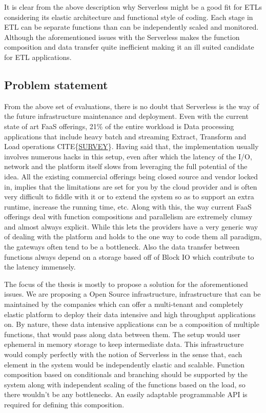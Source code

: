 \documentclass[12pt,titlepage]{article}
\begin{document}
It is clear from the above description why Serverless might be a good fit for
ETLs considering its elastic architecture and functional style of coding. Each
stage in ETL can be separate functions than can be independently scaled and
monitored. Although the aforementioned issues with the Serverless makes the
function composition and data transfer quite inefficient making it an ill suited
candidate for ETL applications.

\subsection{Problem statement}
\label{sec:org8e9acd7}
From the above set of evaluations, there is no doubt that Serverless is the way
of the future infrastructure maintenance and deployment. Even with the current
state of art FaaS offerings, 21\% of the entire workload is Data processing
applications that include heavy batch and streaming Extract, Transform and Load
operations CITE\{\href{https://www.serverless.com/blog/2018-serverless-community-survey-huge-growth-usage/}{SURVEY}\}. Having said that, the implementation usually involves
numerous hacks in this setup, even after which the latency of the I/O, network
and the platform itself slows from leveraging the full potential of the idea.
All the existing commercial offerings being closed source and vendor locked in,  
implies that the limitations are set for you by
the cloud provider and is often very difficult to fiddle with it or to extend
the system so as to support an extra runtime, increase the running time, etc.
Along with this, the way current FaaS offerings deal with function compositions
and parallelism are extremely clumsy and almost always explicit. While this lets
the providers have a very generic way of dealing with the platform and holds to
the one way to code them all paradigm, the gateways often tend to be a
bottleneck. Also the data transfer between functions always depend on a storage
based off of Block IO which contribute to the latency immensely.

The focus of the thesis is mostly to propose a solution for the aforementioned
issues. We are proposing a Open Source infrastructure, infrastructure that can
be maintained by the companies which can offer a multi-tenant and completely elastic
platform to deploy their data intensive and high throughput applications on.
By nature, these data intensive applications can be a composition of multiple
functions, that would pass along data between them. The setup would user
ephemeral in memory storage to keep intermediate data. This infrastructure
would comply perfectly with the notion of Serverless in the sense that, each
element in the system would be independently elastic and scalable. Function
composition based on conditionals and branching should be supported by the
system along with independent scaling of the functions based on the load, so
there wouldn't be any bottlenecks. An easily adaptable programmable API is
required for defining this composition.
\end{document}
